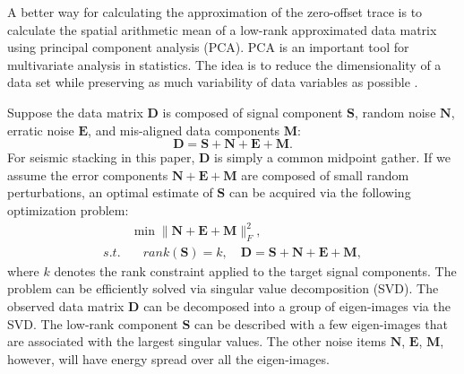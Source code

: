 A better way for calculating the approximation of the zero-offset trace is to calculate the spatial arithmetic mean of a low-rank approximated data matrix using principal component analysis (PCA). PCA is an important tool for multivariate analysis in statistics. The idea is to reduce the dimensionality
of a data set while preserving as much variability of data variables as possible \cite[]{jolliffe2010}.

Suppose the data matrix $\mathbf{D}$ is composed of signal component $\mathbf{S}$, random noise $\mathbf{N}$, erratic noise $\mathbf{E}$, and mis-aligned data components $\mathbf{M}$:
\begin{equation}
\label{eq:pca1}
\mathbf{D} = \mathbf{S} + \mathbf{N} + \mathbf{E} + \mathbf{M}.
\end{equation}
For seismic stacking in this paper, $\mathbf{D}$ is simply a common midpoint gather.
 If we assume the error components $ \mathbf{N} + \mathbf{E} + \mathbf{M}$ are composed of small random perturbations, an optimal estimate of $\mathbf{S}$ can be acquired via the following optimization problem:
 \begin{equation}
 \label{eq:pca2}
 \begin{split}
 &\min \parallel \mathbf{N} + \mathbf{E} + \mathbf{M} \parallel_F^2, \\
 s.t. &\quad rank(\mathbf{S})=k, \quad \mathbf{D} = \mathbf{S} + \mathbf{N} + \mathbf{E} + \mathbf{M},
 \end{split}
 \end{equation}
 where $k$ denotes the rank constraint applied to the target signal components. The problem can be efficiently solved via singular value decomposition (SVD).  The observed data matrix $\mathbf{D}$ can be decomposed into a group of eigen-images via the SVD. The low-rank component $\mathbf{S}$ can be described with a few eigen-images that are associated with the largest singular values. The other noise items $ \mathbf{N}$, $\mathbf{E}$, $\mathbf{M}$, however, will have energy spread over all the eigen-images.
 
